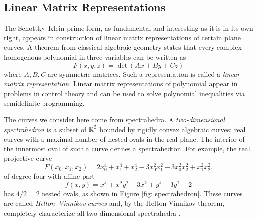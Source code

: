 
\subsection{Linear Matrix Representations}

The Schottky--Klein prime form, as fundamental and interesting as it is
in its own right, appears in construction of linear matrix
representations of certain plane curves. A theorem from classical
algebraic geometry states that every complex homogenous polynomial in
three variables can be written as
\[
    F(x,y,z) = \det \left( Ax + By + Cz \right)
\]
where $A,B,C$ are symmetric matrices. Such a representation is called a
{\it linear matrix representation}. Linear matrix representations of
polynomial appear in problems in control theory and can be used to solve
polynomial inequalities via semidefinite programming.

The curves we consider here come from spectrahedra. A {\it
  two-dimensional spectrahedron} is a subset of $\operatorname{\mathbb{R}}^2$ bounded by
rigidly convex algebraic curves; real curves with a maximal number of
nested ovals in the real plane. The interior of the innermost oval of
such a curve defines a spectrahedron. For example, the real projective
curve
\[
    F(x_0,x_1,x_2) =
    2x_0^4 + x_1^4 + x_2^4 - 3x_0^2x_1^2 - 3x_0^2x_2^2 + x_1^2x_2^2.
\]
of degree four with affine part
\[
    f(x,y) = x^{4} + x^{2} y^{2} - 3 x^{2} + y^{4} - 3 y^{2} + 2
\]
has $4/2 = 2$ nested ovals, as shown in Figure \ref{fig:
  spectrahedron}. These curves are called {\it Helton--Vinnikov curves}
and, by the Helton-Vinnikov theorem, completely characterize all
two-dimensional spectrahedra \cite{HeltonVinnikov07}.

